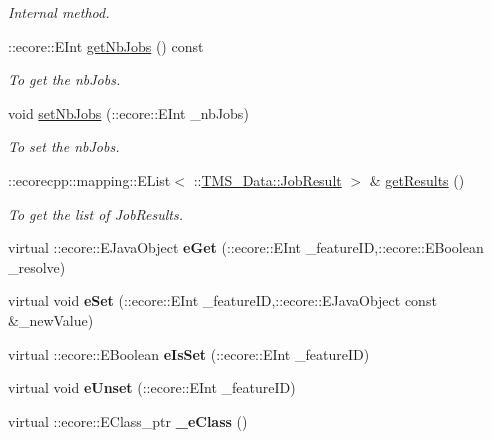 \begin{DoxyCompactItemize}
\begin{DoxyCompactList}\small\item\em Internal method. \item\end{DoxyCompactList}\item 
::ecore::EInt \hyperlink{classTMS__Data_1_1ListJobResults_aa25f9825363e0d7ca7e7a1f859bbf2d4}{getNbJobs} () const 
\begin{DoxyCompactList}\small\item\em To get the nbJobs. \item\end{DoxyCompactList}\item 
void \hyperlink{classTMS__Data_1_1ListJobResults_a43eba365d7f402cb63c65ebfacd07396}{setNbJobs} (::ecore::EInt \_\-nbJobs)
\begin{DoxyCompactList}\small\item\em To set the nbJobs. \item\end{DoxyCompactList}\item 
::ecorecpp::mapping::EList$<$ ::\hyperlink{classTMS__Data_1_1JobResult}{TMS\_\-Data::JobResult} $>$ \& \hyperlink{classTMS__Data_1_1ListJobResults_ae63123bdb1a4168a7a36f761dfe789b7}{getResults} ()
\begin{DoxyCompactList}\small\item\em To get the list of JobResults. \item\end{DoxyCompactList}\item 
\hypertarget{classTMS__Data_1_1ListJobResults_a2675cf6b264d172c9d2ac2e3d48b3691}{
virtual ::ecore::EJavaObject {\bfseries eGet} (::ecore::EInt \_\-featureID,::ecore::EBoolean \_\-resolve)}
\label{classTMS__Data_1_1ListJobResults_a2675cf6b264d172c9d2ac2e3d48b3691}

\item 
\hypertarget{classTMS__Data_1_1ListJobResults_a3b9122815db0e0edc18c9788bd9c0155}{
virtual void {\bfseries eSet} (::ecore::EInt \_\-featureID,::ecore::EJavaObject const \&\_\-newValue)}
\label{classTMS__Data_1_1ListJobResults_a3b9122815db0e0edc18c9788bd9c0155}

\item 
\hypertarget{classTMS__Data_1_1ListJobResults_ad3c9367ee5b1f9fe26bc0546189d1730}{
virtual ::ecore::EBoolean {\bfseries eIsSet} (::ecore::EInt \_\-featureID)}
\label{classTMS__Data_1_1ListJobResults_ad3c9367ee5b1f9fe26bc0546189d1730}

\item 
\hypertarget{classTMS__Data_1_1ListJobResults_a7fe8a6e3b5aad352165a015049d3ca5a}{
virtual void {\bfseries eUnset} (::ecore::EInt \_\-featureID)}
\label{classTMS__Data_1_1ListJobResults_a7fe8a6e3b5aad352165a015049d3ca5a}

\item 
\hypertarget{classTMS__Data_1_1ListJobResults_aa99d68c957b1a19edbcb4d1ffbe66cd2}{
virtual ::ecore::EClass\_\-ptr {\bfseries \_\-eClass} ()}
\label{classTMS__Data_1_1ListJobResults_aa99d68c957b1a19edbcb4d1ffbe66cd2}

\end{DoxyCompactItemize}
